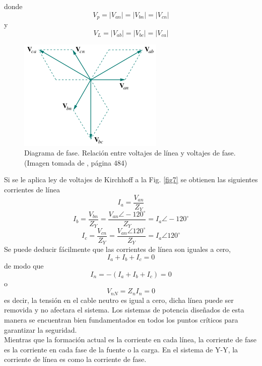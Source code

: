 \documentclass[twocolumn]{IEEEtran}
\begin{document}
\noindent
donde
\begin{equation}
 {V_p} = \left| {{V_{an}}} \right| = \left| {{V_{bn}}} \right| = \left| {{V_{cn}}} \right|
\label{ecu13}
\end{equation}
\noindent
y
\begin{equation}
 {V_L} = \left| {{V_{ab}}} \right| = \left| {{V_{bc}}} \right| = \left| {{V_{ca}}} \right|
\label{ecu14}
\end{equation}
\begin{figure}[H]
	\centering
		\includegraphics[scale=0.75]{diagramafase.png}
	\caption{Diagrama de fase. Relación entre voltajes de línea y voltajes de fase. (Imagen tomada de \cite{sadiku}, página 484)}
	\label{fig8}
\end{figure}
\noindent
Si se le aplica ley de voltajes de Kirchhoff a la Fig. \ref{fig7} se obtienen las siguientes corrientes de línea
\begin{equation}
 I_a = \frac{V_{an}}{Z_Y}
\label{ecu15}
\end{equation}
\begin{equation}
 I_b= \frac{V_{bn}}{Z_Y} = \frac{V_{an}\angle -120 ^{\circ}}{Z_Y}= I_a \angle -120 ^{\circ}
\label{16}
\end{equation}
\begin{equation}
 I_c= \frac{V_{cn}}{Z_Y} = \frac{V_{an}\angle 120 ^{\circ}}{Z_Y}= I_a \angle 120 ^{\circ}
\label{17}
\end{equation}
\noindent
Se puede deducir fácilmente que las corrientes de línea son iguales a cero,
\begin{equation}
 I_a + I_b + I_c = 0
\label{ecu18}
\end{equation}
\noindent
de modo que
\begin{equation}
 {I_n} =  - \left( {{I_a} + {I_b} + {I_c}} \right) = 0
\label{ecu19}
\end{equation}
\noindent
o
\begin{equation}
 V_{nN}= Z_n I_n = 0
\label{ecu20}
\end{equation}
\noindent
es decir, la tensión en el cable neutro es igual a cero, dicha línea puede ser removida y no afectara el sistema. Los sistemas de potencia diseñados de esta manera se encuentran bien fundamentados en todos los puntos críticos para garantizar la seguridad.\\
Mientras que la formación actual es la corriente en cada línea, la corriente de fase es la corriente en cada fase de la fuente o la carga. En el sistema de Y-Y, la corriente de línea es como la corriente de fase.
\end{document}
